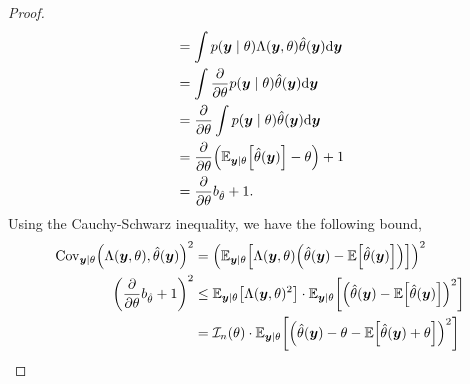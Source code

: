 \begin{proof}
\begin{align*}
                                                                                                   & = \int p(\vec{y}\mid\theta) \Lambda(\vec{y}, \theta) \hat{\theta}(\vec{y}) \mathrm{d}\vec{y}                                                                                                      \\
                                                                                                   & = \int \pdv*{p(\vec{y} \mid \theta)}{\theta} \hat{\theta}(\vec{y}) \mathrm{d}\vec{y}                                                                                                              \\
                                                                                                   & = \pdv*{\int p(\vec{y} \mid \theta) \hat{\theta}(\vec{y}) \mathrm{d}\vec{y}}{\theta}                                                                                                              \\
                                                                                                   & = \pdv*{\lft( \E_{\vec{y}\mid \theta}\lft[\hat{\theta}(\vec{y})\rgt] - \theta \rgt)}{\theta} + 1                                                                                                  \\
                                                                                                   & = \pdv*{b_{\hat{\theta}}}{\theta} + 1.
    \end{align*}
    Using the Cauchy-Schwarz inequality, we have the following bound,
    \begin{align*}
        \mathrm{Cov}_{\vec{y}\mid \theta} \lft( \Lambda(\vec{y}, \theta), \hat{\theta}(\vec{y}) \rgt)^2 & = \lft( \E_{\vec{y}\mid \theta} \lft[ \Lambda(\vec{y},\theta) \lft( \hat{\theta}(\vec{y}) - \E \lft[ \hat{\theta}(\vec{y}) \rgt] \rgt) \rgt] \rgt)^2                                           \\
        \lft( \pdv*{b_{\hat{\theta}}}{\theta} + 1 \rgt)^2                                               & \leq \E_{\vec{y}\mid \theta}\lft[ \Lambda(\vec{y},\theta)^2 \rgt] \cdot \E_{\vec{y} \mid \theta} \lft[ \lft( \hat{\theta}(\vec{y}) - \E \lft[ \hat{\theta}(\vec{y}) \rgt] \rgt)^2 \rgt]        \\
                                                                                                        & = \mathcal{I}_n(\theta) \cdot \E_{\vec{y} \mid \theta} \lft[ \lft( \hat{\theta}(\vec{y}) - \theta - \E \lft[ \hat{\theta}(\vec{y}) + \theta \rgt] \rgt)^2 \rgt]                                \\

\end{align*}
\end{proof}
